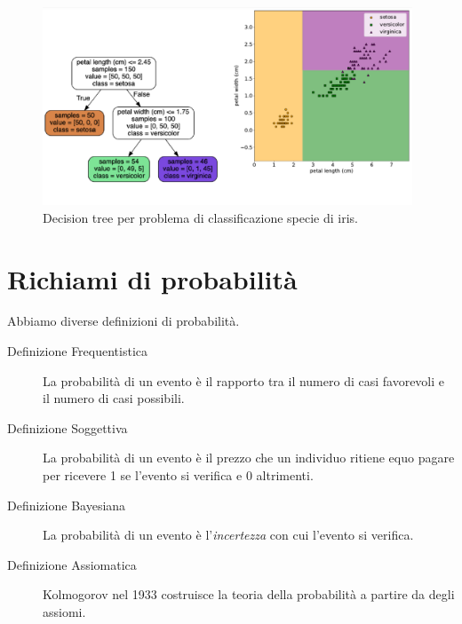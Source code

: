 \documentclass[10pt]{article}
\begin{document}
\begin{example}
\begin{figure}
\includegraphics[width=0.98\textwidth]{Images/iris_decision_tree.PNG}
\caption{Decision tree per problema di classificazione specie di iris.}\label{fig:iris-decision-tree}
\end{figure}

\end{example}

\section{Richiami di probabilità}
Abbiamo diverse definizioni di probabilità.
\begin{description}
\item[Definizione Frequentistica] La probabilità di un evento è il rapporto tra il numero di casi favorevoli e il numero di casi possibili.
\item[Definizione Soggettiva] La probabilità di un evento è il prezzo che un individuo ritiene equo pagare per ricevere 1 se l'evento si verifica e 0 altrimenti.
\item[Definizione Bayesiana] La probabilità di un evento è l'\textit{incertezza} con cui l'evento si verifica.
\item[Definizione Assiomatica] Kolmogorov nel 1933 costruisce la teoria della probabilità a partire da degli assiomi.
\end{description}
\end{document}

